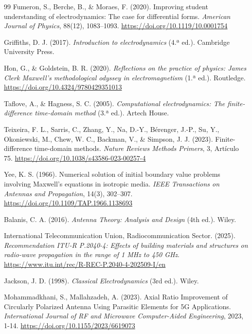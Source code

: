 
\begingroup
\renewcommand{\bibsection}{}
\begin{thebibliography}{99}
Fumeron, S., Berche, B., \& Moraes, F. (2020). Improving student understanding of electrodynamics: The case for differential forms. \textit{American Journal of Physics}, 88(12), 1083--1093. \url{https://doi.org/10.1119/10.0001754}

Griffiths, D. J. (2017). \textit{Introduction to electrodynamics} (4.ª ed.). Cambridge University Press.

Hon, G., \& Goldstein, B. R. (2020). \textit{Reflections on the practice of physics: James Clerk Maxwell’s methodological odyssey in electromagnetism} (1.ª ed.). Routledge. \url{https://doi.org/10.4324/9780429351013}

Taflove, A., \& Hagness, S. C. (2005). \textit{Computational electrodynamics: The finite-difference time-domain method} (3.ª ed.). Artech House.

Teixeira, F. L., Sarris, C., Zhang, Y., Na, D.-Y., Bérenger, J.-P., Su, Y., Okoniewski, M., Chew, W. C., Backman, V., \& Simpson, J. J. (2023). Finite-difference time-domain methods. \textit{Nature Reviews Methods Primers}, 3, Artículo 75. \url{https://doi.org/10.1038/s43586-023-00257-4}

Yee, K. S. (1966). Numerical solution of initial boundary value problems involving Maxwell’s equations in isotropic media. \textit{IEEE Transactions on Antennas and Propagation}, 14(3), 302--307. \url{https://doi.org/10.1109/TAP.1966.1138693}

Balanis, C. A. (2016). \textit{Antenna Theory: Analysis and Design} (4th ed.). Wiley.

International Telecommunication Union, Radiocommunication Sector. (2025). \textit{Recommendation ITU-R P.2040-4: Effects of building materials and structures on radio-wave propagation in the range of 1 MHz to 450 GHz}. \url{https://www.itu.int/rec/R-REC-P.2040-4-202509-I/en}

Jackson, J. D. (1998). \textit{Classical Electrodynamics} (3rd ed.). Wiley.

Mohammadkhani, S., Mallahzadeh, A. (2023). Axial Ratio Improvement of Circularly Polarized Antenna Using Parasitic Elements for 5G Applications. \textit{International Journal of RF and Microwave Computer-Aided Engineering}, 2023, 1-14. \url{https://doi.org/10.1155/2023/6619073}


\end{thebibliography}
